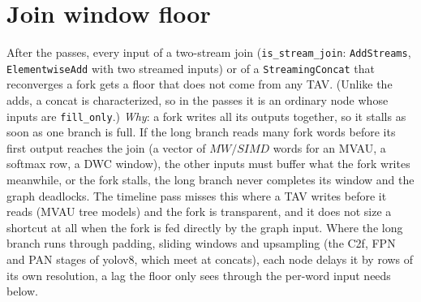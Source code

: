 \documentclass[10pt,a4paper]{article}
\newcommand{\code}[1]{\texttt{#1}}
\begin{document}
\section{Join window floor}\label{sec:joinfloor}

After the passes, every input of a two-stream join (\code{is\_stream\_join}:
\code{AddStreams}, \code{ElementwiseAdd} with two streamed inputs) or of a
\code{StreamingConcat} that reconverges a fork gets a floor that does not come from
any TAV. (Unlike the adds, a concat is characterized, so in the passes it is an ordinary
node whose inputs are \code{fill\_only}.) \emph{Why}: a fork writes all its outputs
together, so it stalls as soon as one branch is full. If the long branch reads many
fork words before its first output reaches the join (a vector of $MW/SIMD$ words for an
MVAU, a softmax row, a DWC window), the other inputs must buffer what the fork writes
meanwhile, or the fork stalls, the long branch never completes its window and the
graph deadlocks. The timeline pass misses this where a TAV writes before it reads
(MVAU tree models) and the fork is transparent, and it does not size a shortcut at
all when the fork is fed directly by the graph input. Where the long branch runs
through padding, sliding windows and upsampling (the C2f, FPN and PAN stages of yolov8,
which meet at concats), each node delays it by rows of its own resolution, a lag the
floor only sees through the per-word input needs below.
\end{document}
